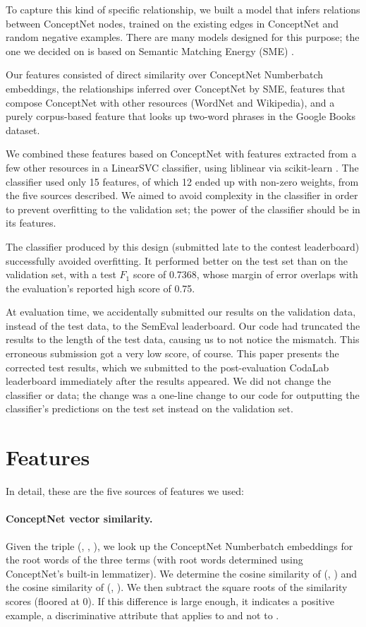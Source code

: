 \documentclass[11pt,a4paper]{article}
\begin{document}
To capture this kind of specific relationship, we built a model that infers
relations between ConceptNet nodes, trained on the existing edges in ConceptNet
and random negative examples. There are many models designed for this purpose;
the one we decided on is based on Semantic Matching Energy (SME)
\cite{bordes2014semantic}.

Our features consisted of direct similarity over ConceptNet Numberbatch embeddings, the
relationships inferred over ConceptNet by SME, features that compose ConceptNet
with other resources (WordNet and Wikipedia), and a purely corpus-based feature
that looks up two-word phrases in the Google Books dataset.

We combined these features based on ConceptNet with features extracted from a
few other resources in a LinearSVC classifier, using liblinear
\cite{fan2008liblinear} via scikit-learn \cite{pedregosa2011scikit}. The
classifier used only 15 features, of which 12 ended up with non-zero weights,
from the five sources described. We aimed to avoid complexity in the classifier
in order to prevent overfitting to the validation set; the power of the
classifier should be in its features.

The classifier produced by this design (submitted late to the contest
leaderboard) successfully avoided overfitting. It performed better on the test
set than on the validation set, with a test $F_1$ score of 0.7368, whose margin of
error overlaps with the evaluation's reported high score of 0.75.

At evaluation time, we accidentally submitted our results on the validation
data, instead of the test data, to the SemEval leaderboard. Our code had
truncated the results to the length of the test data, causing us to not notice
the mismatch. This erroneous submission got a very low score, of course. This
paper presents the corrected test results, which we submitted to the
post-evaluation CodaLab leaderboard immediately after the results appeared.  We
did not change the classifier or data; the change was a one-line change to our
code for outputting the classifier's predictions on the test set instead on the
validation set.


\section{Features}

In detail, these are the five sources of features we used:

\paragraph{ConceptNet vector similarity.} Given the triple (\termOne, \termTwo,
\att), we look up the ConceptNet Numberbatch embeddings for the root words of the
three terms (with root words determined using ConceptNet's built-in
lemmatizer). We determine the cosine similarity of (\termOne, \att) and the
cosine similarity of (\termTwo, \att). We then subtract the square roots of the
similarity scores (floored at 0). If this difference is large enough, it
indicates a positive example, a discriminative attribute that applies to
\termOne{} and not to \termTwo.
\end{document}
